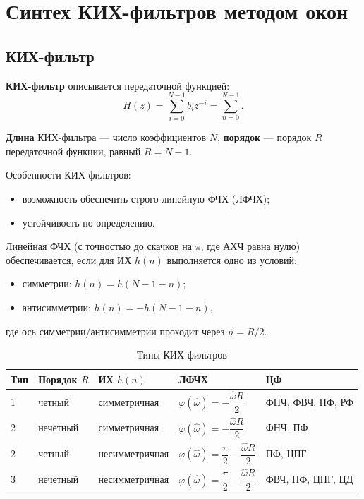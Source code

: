 \documentclass[a4paper, 14pt]{extarticle}
\begin{document}
\section{Синтех КИХ-фильтров методом окон}
\subsection{КИХ-фильтр}\label{subsec:fir}
\textbf{КИХ-фильтр} описывается передаточной функцией:
\begin{equation}
    H(z) = \sum^{N-1}_{i=0} b_i z^{-i} = \sum^{N-1}_{n=0}.
\end{equation}

\textbf{Длина} КИХ-фильтра --- число коэффициентов $N$, \textbf{порядок} --- порядок $R$ передаточной функции, равный $R=N-1$.

Особенности КИХ-фильтров:
\begin{itemize}
    \item возможность обеспечить строго линейную ФЧХ (ЛФЧХ);
    \item устойчивость по определению.
\end{itemize}

Линейная ФЧХ (с точностью до скачков на $\pi$, где АХЧ равна нулю) обеспечивается, если для ИХ $h(n)$ выполняется одно из условий:
\begin{itemize}
    \item симметрии: $h(n) = h(N - 1 - n)$;
    \item антисимметрии: $h(n) = -h(N-1-n)$,
\end{itemize}
где ось симметрии/антисимметрии проходит через $n=R/2$.


\begin{table}[h]
\centering
\caption{Типы КИХ-фильтров}
\begin{tabularx}{\textwidth}{@{}lllXl@{}}
\toprule
\textbf{Тип} & \textbf{Порядок $R$} & \textbf{ИХ $h(n)$} & \textbf{ЛФЧХ} & \textbf{ЦФ}      \\ \midrule
1            & четный               & симметричная       & $\varphi(\hat{\omega}) = - \dfrac{\hat{\omega}R}{2} $ & ФНЧ, ФВЧ, ПФ, РФ \\
2            & нечетный             & симметричная       & $\varphi(\hat{\omega}) = - \dfrac{\hat{\omega}R}{2}$ & ФНЧ, ПФ          \\
2            & четный               & несимметричная     & $ \varphi(\hat{\omega}) = \dfrac{\pi}{2} - \dfrac{\hat{\omega}R}{2}$ & ПФ, ЦПГ          \\
3            & нечетный             & несимметричная     & $\varphi(\hat{\omega}) = \dfrac{\pi}{2} - \dfrac{\hat{\omega}R}{2}$ & ФВЧ, ПФ, ЦПГ, ЦД \\ \bottomrule
\end{tabularx}
\end{table}
\end{document}
